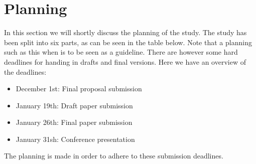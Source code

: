 \section{Planning}
\label{sec:planning}

In this section we will shortly discuss the planning of the study.
The study has been split into six parts, as can be seen in the table below.
Note that a planning such as this when is to be seen as a guideline.
There are however some hard deadlines for handing in drafts and final versions.
Here we have an overview of the deadlines:

\begin{itemize}
    \item December 1st: Final proposal submission
    \item January 19th: Draft paper submission
    \item January 26th: Final paper submission
    \item January 31sh: Conference presentation
\end{itemize}
The planning is made in order to adhere to these submission deadlines.


